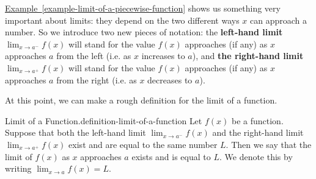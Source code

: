\documentclass[10pt,]{book}
\newcommand{\terminology}[1]{\textbf{#1}}
\numberwithin{equation}{section}
\begin{document}
\hypertarget{p-13}{}%
\hyperref[example-limit-of-a-piecewise-function]{Example~\ref{example-limit-of-a-piecewise-function}} shows us something very important about limits: they depend on the two different ways \(x\) can approach a number. So we introduce two new pieces of notation: the \terminology{left-hand limit} \(\lim_{x\to a^{-}}f(x)\) will stand for the value \(f(x)\) approaches (if any) as \(x\) approaches \(a\) from the left (i.e. as \(x\) increases to \(a\)), and \terminology{the right-hand limit} \(\lim_{x\to a^{+}}f(x)\) will stand for the value \(f(x)\) approaches (if any) as \(x\) approaches \(a\) from the right (i.e. as \(x\) decreases to \(a\)).%
\par
\hypertarget{p-14}{}%
At this point, we can make a rough definition for the limit of a function.%
\begin{definition}{Limit of a Function.}{definition-limit-of-a-function}%
\hypertarget{p-15}{}%
Let \(f(x)\) be a function. Suppose that both the left-hand limit \(\lim_{x\to a^{-}}f(x)\) and the right-hand limit \(\lim_{x\to a^{+}}f(x)\) exist and are equal to the same number \(L\). Then we say that the limit of \(f(x)\) as \(x\) approaches \(a\) exists and is equal to \(L\). We denote this by writing \(\lim_{x\to a}f(x) = L\).%
\end{definition}
\end{document}
